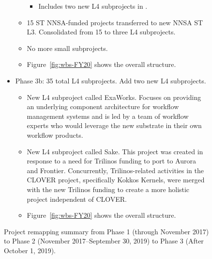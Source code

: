\begin{figure}
\begin{mdframed}
\begin{itemize}
\begin{itemize}
\begin{itemize}
	\item Includes two new L4 subprojects in \ecosystem.
	\end{itemize}
	\item 15 ST NNSA-funded projects transferred to new NNSA ST L3. Consolidated from 15 to three L4 subprojects.
	\item No more small subprojects.
	\item Figure~\ref{fig:wbs-FY20} shows the overall structure.
\end{itemize}
\item Phase 3b: 35 total L4 subprojects.  Add two new L4 subprojects.
\begin{itemize}
	\item New L4 subproject called ExaWorks.  Focuses on providing an underlying component architecture for workflow management systems and is led by a team of workflow experts who would leverage the new substrate in their own workflow products.
	\item New L4 subproject called Sake.  This project was created in response to a need for Trilinos funding to port to Aurora and Frontier.  Concurrently, Trilinos-related activities in the CLOVER project, specifically Kokkos Kernels, were merged with the new Trilinos funding to create a more holistic project independent of CLOVER.
	\item Figure~\ref{fig:wbs-FY20} shows the overall structure.
\end{itemize}
\end{itemize}
\end{mdframed}

\caption{\label{fig:project-remapping}Project remapping summary from Phase 1 (through November 2017) to Phase 2 (November 2017--September 30, 2019) to Phase 3 (After October 1, 2019).}
\end{figure}


